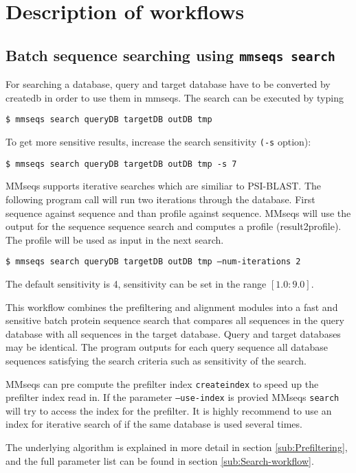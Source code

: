 \documentclass[11pt,a4paper]{report}
\begin{document}
\section{Description of workflows}


\subsection{Batch sequence searching using \texttt{mmseqs search}}

For searching a database, query and target database have to be converted by createdb in order to use them in mmseqs.
The search can be executed by typing

\texttt{\$ mmseqs search queryDB targetDB outDB tmp}

To get more sensitive results, increase the search sensitivity \texttt{(-s}
option):

\texttt{\$ mmseqs search queryDB targetDB outDB tmp -s 7}

MMseqs supports iterative searches which are similiar to PSI-BLAST.  
The following program call will run two iterations through the database. First sequence against sequence and than profile against sequence.
MMseqs will use the output for the sequence sequence search and computes a profile (result2profile). The profile will be used as input in the next search. 

\texttt{\$ mmseqs search queryDB targetDB outDB tmp --num-iterations 2}

The default sensitivity is 4, sensitivity can be set in the range
$[1.0:9.0]$.

This workflow combines the prefiltering and alignment modules into
a fast and sensitive batch protein sequence search that compares all
sequences in the query database with all sequences in the target database\emph{.
}Query and target databases may be identical. The program outputs
for each query sequence all database sequences satisfying the search
criteria such as sensitivity of the search.

MMseqs can pre compute the prefilter index \texttt{createindex} to speed up the prefilter index read in.
If the parameter \texttt{--use-index} is provied MMseqs \texttt{search} will try to access the index for the prefilter.
It is highly recommend to use an index for iterative search of if the same database is used several times.

The underlying algorithm is explained in more detail in section \ref{sub:Prefiltering},
and the full parameter list can be found in section \ref{sub:Search-workflow}.
\end{document}
